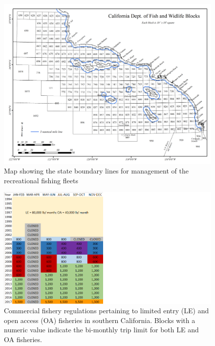 \documentclass[12pt,]{article}
\begin{document}
\begin{figure}[htbp]
\centering
\includegraphics{Figures/boundary_map.png}
\caption{Map showing the state boundary lines for management of the
recreational fishing fleets \label{fig:boundary_map}}
\end{figure}

\begin{figure}[htbp]
\centering
\includegraphics{Figures/Com_regs.png}
\caption{Commercial fishery regulations pertaining to limited entry (LE)
and open access (OA) fisheries in southern California. Blocks with a
numeric value indicate the bi-monthly trip limit for both LE and OA
fisheries. \label{fig:Com_regs}}
\end{figure}
\end{document}
